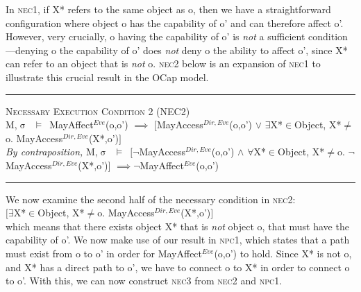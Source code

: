\documentclass[a4paper,11pt, twoside,twocolumn]{article}
\newenvironment{logic}[1][null]
{\begin{flushleft} \small \label{#1}}
{\end{flushleft}}
\newcommand{\loin}{$\in$}
\newcommand{\loforall}{$\forall$}
\newcommand{\loexists}{$\exists$}
\newcommand{\loand}{$\land$}
\newcommand{\loor} {$\lor$}
\newcommand{\loneq} {$\neq$}
\newcommand{\loimplies}{$\implies$}
\newcommand{\losigma}{$\upsigma$}
\newcommand{\loturns} {$\vDash$}
\newcommand{\loneg}{$\neg$}
\newcommand{\ablock} {\null\qquad}
\begin{document}
In \textsc{nec1}, if X* refers to the same object as o, then we have a straightforward configuration where object o has the capability of o' and can therefore affect o'. However, very crucially, o having the capability of o' is \textit{not} a sufficient condition---denying o the capability of o' does \textit{not} deny o the ability to affect o', since X* can refer to an object that is \textit{not} o. \textsc{nec2} below is an expansion of \textsc{nec1} to illustrate this crucial result in the OCap model.
\begin{logic}
\hrule\null
\textsc{\normalsize *Necessary Execution Condition 2 (NEC2)}\\
M,\losigma\ \loturns\ MayAffect$^{Eve}$(o,o') \loimplies\linebreak
	\ablock $[$MayAccess$^{Dir,Eve}$(o,o') \loor\linebreak
	\ablock \loexists X*\loin{Object}, X*\loneq o. MayAccess$^{Dir,Eve}$(X*,o')$]$
\linebreak\\
\textit{By contraposition,}\linebreak
M,\losigma\ \loturns\ $[$\loneg MayAccess$^{Dir,Eve}$(o,o') \loand\linebreak
	\ablock \loforall X*\loin{Object}, X*\loneq o. \loneg MayAccess$^{Dir,Eve}$(X*,o')$]$ \linebreak
	\ablock \loimplies\loneg MayAffect$^{Eve}$(o,o')\linebreak
\hrule
\end{logic}
We now examine the second half of the necessary condition in \textsc{nec2}:\\
$[$\loexists X*\loin{Object}, X*\loneq o. MayAccess$^{Dir,Eve}$(X*,o')$]$
\\ which means that there exists object X* that is \textit{not} object o, that must have the capability of o'.
We now make use of our result in \textsc{npc1}, which states that a path must exist from o to o' in order for MayAffect$^{Eve}$(o,o') to hold. Since X* is not o, and X* has a direct path to o', we have to connect o to X* in order to connect o to o'. With this, we can now construct \textsc{nec3} from \textsc{nec2} and \textsc{npc1}.
\end{document}
